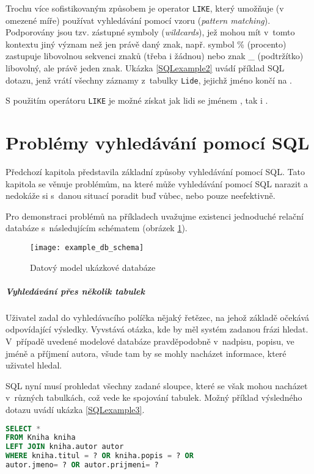 \documentclass[11pt,oneside]{fithesis2}
\begin{document}
Trochu více sofistikovaným způsobem je operator \texttt{LIKE}, který umožňuje (v omezené míře) používat vyhledávání pomocí vzoru (\emph{pattern matching}). Podporovány jsou tzv. zástupné symboly (\emph{wildcards}), jež mohou mít v~tomto kontextu jiný význam než jen právě daný znak, např. symbol \% (procento) zastupuje libovolnou sekvenci znaků (třeba i žádnou) nebo znak \_ (podtržítko) libovolný, ale právě jeden znak. Ukázka \ref{SQLexample2} uvádí příklad SQL dotazu, jenž vrátí všechny záznamy z~tabulky \texttt{Lide}, jejichž jméno končí na .

S použitím operátoru \texttt{LIKE} je možné získat jak lidi se jménem , tak i . 

\section{Problémy vyhledávání pomocí SQL}
\label{ProblemyVyhledavaniSQL}
Předchozí kapitola představila základní způsoby vyhledávání pomocí SQL. Tato kapitola se věnuje problémům, na které může vyhledávání pomocí SQL narazit a nedokáže si s~danou situací poradit buď vůbec, nebo pouze neefektivně.

Pro demonstraci problémů na příkladech uvažujme existenci jednoduché relační databáze s~následujícím schématem (obrázek \ref{example_schema}).

\begin{figure}[htbp]
	\begin{center}
		\texttt{[image: example\_db\_schema]}
	\end{center}
	\caption{Datový model ukázkové databáze}	
	\label{example_schema}
\end{figure}

\subparagraph{Vyhledávání přes několik tabulek}
Uživatel zadal do vyhledávacího políčka nějaký řetězec, na jehož základě očekává odpovídající výsledky. Vyvstává otázka, kde by měl systém zadanou frázi hledat. V~případě uvedené modelové databáze pravděpodobně v~nadpisu, popisu, ve jméně a příjmení autora, všude tam by se mohly nacházet informace, které uživatel hledal. 

SQL nyní musí prohledat všechny zadané sloupce, které se však mohou nacházet v~různých tabulkách, což vede ke spojování tabulek. Možný příklad výsledného dotazu uvádí ukázka \ref{SQLexample3}.

\begin{lstlisting}[language=SQL, caption =  SQL dotaz vyhledávající přes několik tabulek, label = SQLexample3]
SELECT *
FROM Kniha kniha 
LEFT JOIN kniha.autor autor 
WHERE kniha.titul = ? OR kniha.popis = ? OR 
autor.jmeno= ? OR autor.prijmeni= ?
\end{lstlisting}
\end{document}
